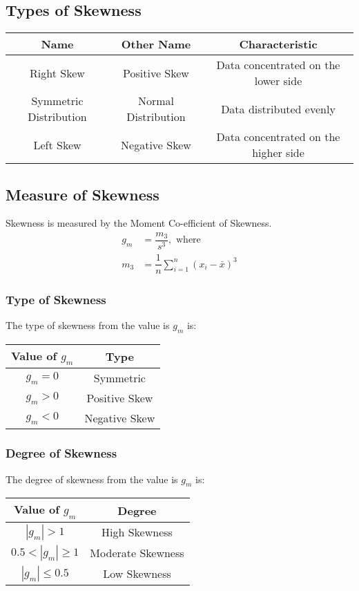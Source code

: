 \documentclass[openany, oneside]{book}
\begin{document}
\subsection{Types of Skewness}
\begin{table}[!h]
	\centering
	\begin{tabular}{c|c|c}
		Name & Other Name & Characteristic\\
		\hline
		Right Skew & Positive Skew & Data concentrated on the lower side\\
		Symmetric Distribution & Normal Distribution & Data distributed evenly\\
		Left Skew & Negative Skew & Data concentrated on the higher side
	\end{tabular}
\end{table}

\subsection{Measure of Skewness}
Skewness is measured by the Moment Co-efficient of Skewness.
\begin{align}
	g_m &= \dfrac{m_3}{s^3}, \text{ where}\\
	m_3 &= \dfrac{1}{n}\sum_{i=1}^{n} \left( x_i - \bar{x} \right)^3
\end{align}

\subsubsection{Type of Skewness}
The type of skewness from the value is $g_m$ is:
\begin{table}[h!]
	\centering
	\begin{tabular}{c|c}
		Value of $g_m$ & Type\\
		\hline
		$g_m = 0$ & Symmetric\\
		$g_m > 0$ & Positive Skew\\
		$g_m < 0$ & Negative Skew
	\end{tabular}
\end{table}

\subsubsection{Degree of Skewness}
The degree of skewness from the value is $g_m$ is:
\begin{table}[h!]
	\centering
	\begin{tabular}{c|c}
		Value of $g_m$ & Degree\\
		\hline
		$|g_m| > 1$ & High Skewness\\
		$0.5 <|g_m| \geq 1$ & Moderate Skewness\\
		$|g_m| \leq 0.5$ & Low Skewness
	\end{tabular}
\end{table}
\end{document}
